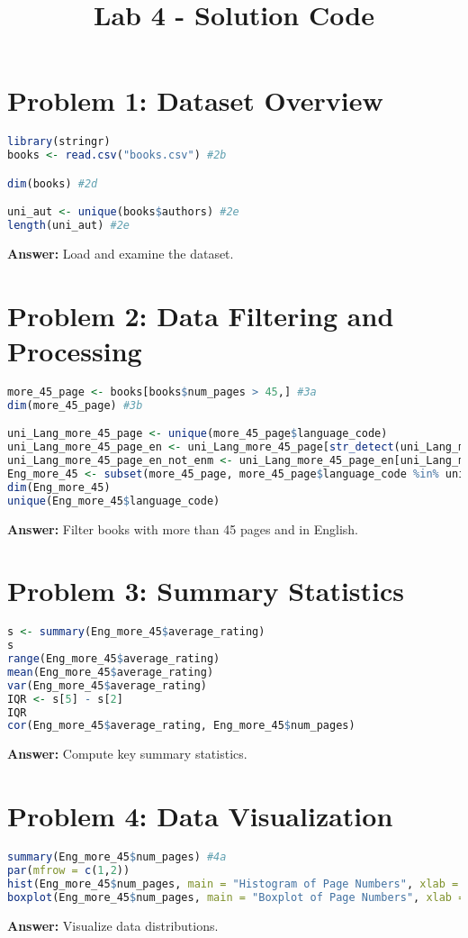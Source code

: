\documentclass[12pt]{article}
\title{Lab 4 - Solution Code}
\author{}
\date{}
\begin{document}
\maketitle

\section*{Problem 1: Dataset Overview}
\begin{lstlisting}[language=R]
library(stringr)
books <- read.csv("books.csv") #2b

dim(books) #2d

uni_aut <- unique(books$authors) #2e
length(uni_aut) #2e
\end{lstlisting}
\textbf{Answer:} Load and examine the dataset.

\section*{Problem 2: Data Filtering and Processing}
\begin{lstlisting}[language=R]
more_45_page <- books[books$num_pages > 45,] #3a
dim(more_45_page) #3b

uni_Lang_more_45_page <- unique(more_45_page$language_code)
uni_Lang_more_45_page_en <- uni_Lang_more_45_page[str_detect(uni_Lang_more_45_page, "en")] #3c_ii
uni_Lang_more_45_page_en_not_enm <- uni_Lang_more_45_page_en[uni_Lang_more_45_page_en != "enm"] #3c_iii
Eng_more_45 <- subset(more_45_page, more_45_page$language_code %in% uni_Lang_more_45_page_en_not_enm) #3c_iv
dim(Eng_more_45)
unique(Eng_more_45$language_code) 
\end{lstlisting}
\textbf{Answer:} Filter books with more than 45 pages and in English.

\section*{Problem 3: Summary Statistics}
\begin{lstlisting}[language=R]
s <- summary(Eng_more_45$average_rating)
s
range(Eng_more_45$average_rating)
mean(Eng_more_45$average_rating)
var(Eng_more_45$average_rating)
IQR <- s[5] - s[2]
IQR
cor(Eng_more_45$average_rating, Eng_more_45$num_pages)
\end{lstlisting}
\textbf{Answer:} Compute key summary statistics.

\section*{Problem 4: Data Visualization}
\begin{lstlisting}[language=R]
summary(Eng_more_45$num_pages) #4a
par(mfrow = c(1,2))
hist(Eng_more_45$num_pages, main = "Histogram of Page Numbers", xlab = "Number of Pages") #4b
boxplot(Eng_more_45$num_pages, main = "Boxplot of Page Numbers", xlab = "Number of Pages") #4c
\end{lstlisting}
\textbf{Answer:} Visualize data distributions.
\end{document}
